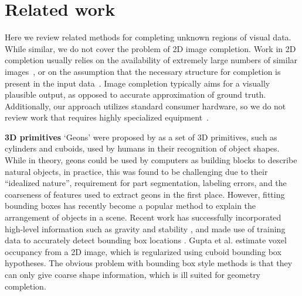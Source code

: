 \documentclass[10pt,twocolumn,letterpaper]{article}
\makeatletter
\renewcommand*{\eg}{e.g.\@\xspace}
\newcommand*{\ea}{et al.\@\xspace}
\newcommand{\todo}[1]{\textcolor{red}{TODO: #1}}
\renewcommand{\paragraph}{\vspace{2pt}\noindent\textbf}
\makeatother
\begin{document}
\section{Related work}



Here we review related methods for completing unknown regions of visual data.
While similar, we do not cover the problem of 2D image completion.
Work in 2D completion usually relies on the availability of extremely large numbers of similar images~\cite{hays-siggraph-2007}, or on the assumption that the necessary structure for completion is present in the input data~\cite{criminisi-cvpr-2003}.
Image completion typically aims for a visually plausible output, as opposed to accurate approximation of ground truth.
Additionally, our approach utilizes standard consumer hardware, so we do not review work that requires highly specialized equipment~\cite{velten-nature-2012}.


\paragraph{3D primitives}\newline
`Geons' were proposed by \cite{bieberman-rbc-1987} as a set of 3D primitives, such as cylinders and cuboids, used by humans in their recognition of object shapes.
While in theory, geons could be used by computers as building blocks to describe natural objects, in practice, this was found to be challenging \cite{dickinson-iavc-1997} due to their ``idealized nature'', requirement for part segmentation, labeling errors, and the coarseness of features used to extract geons in the first place.
However, fitting bounding boxes has recently become a popular method to explain the arrangement of objects in a scene.
Recent work has successfully incorporated high-level information such as gravity and stability
 \cite{shao-siggraphasia-2014, jia-pami-2015}, and made use of training data to accurately detect bounding box locations \cite{hedau-cvpr-2012}.
Gupta \ea \cite{gupta-cvpr-2011} estimate voxel occupancy from a 2D image, which is regularized using cuboid bounding box hypotheses.
The obvious problem with bounding box style methods is that they can only give coarse shape information, which is ill suited for geometry completion.
\end{document}
